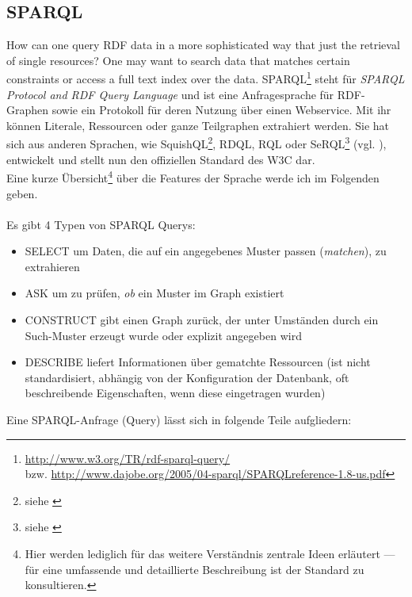 \subsection{SPARQL} \label{sec:sparql}
How can one query RDF data in a more sophisticated way that just the retrieval of single resources? One may want to search data that matches certain constraints or access a full text index over the data.
SPARQL\footnote{\url{http://www.w3.org/TR/rdf-sparql-query/} \\
bzw. \url{http://www.dajobe.org/2005/04-sparql/SPARQLreference-1.8-us.pdf}} steht für \emph{SPARQL Protocol and RDF Query Language} und ist eine Anfragesprache für RDF-Graphen sowie ein Protokoll für deren Nutzung über einen Webservice. Mit ihr können Literale, Ressourcen oder ganze Teilgraphen extrahiert werden. Sie hat sich aus anderen Sprachen, wie SquishQL\footnote{siehe \cite{squishQL}}, RDQL, RQL oder SeRQL\footnote{siehe \cite{serql}} (vgl. \cite{compQL}), entwickelt und stellt nun den offiziellen Standard des W3C dar.\\
Eine kurze Übersicht\footnote{Hier werden lediglich für das weitere Verständnis zentrale Ideen erläutert --- für eine umfassende und detaillierte Beschreibung ist der Standard zu konsultieren.} über die Features der Sprache werde ich im Folgenden geben.\\
\vspace{0.1cm}\\
Es gibt 4 Typen von SPARQL Querys:
\begin{itemize}
	\item{SELECT um Daten, die auf ein angegebenes Muster passen (\emph{matchen}), zu extrahieren}
	\item{ASK um zu prüfen, \emph{ob} ein Muster im Graph existiert}
	\item{CONSTRUCT gibt einen Graph zurück, der unter Umständen durch ein Such-Muster erzeugt wurde oder explizit angegeben wird}
	\item{DESCRIBE liefert Informationen über gematchte Ressourcen (ist nicht standardisiert, abhängig von der Konfiguration der Datenbank, oft beschreibende Eigenschaften, wenn diese eingetragen wurden)}
\end{itemize}
Eine SPARQL-Anfrage (Query) lässt sich in folgende Teile aufgliedern:

